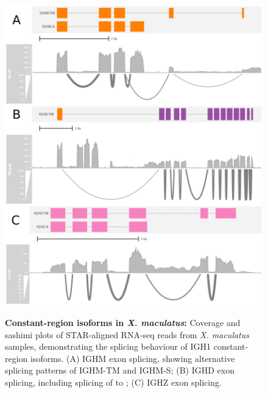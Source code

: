 			\begin{figure}
	\includegraphics[width=\textwidth]{_Figures/png/xma-locus-sashimi}
	\begin{subfigure}{0em}
        \label{fig:xma-locus-sashimi-m}
    \end{subfigure}
    \begin{subfigure}{0em}
        \label{fig:xma-locus-sashimi-d}
    \end{subfigure}
    \begin{subfigure}{0em}
        \label{fig:xma-locus-sashimi-z}
    \end{subfigure}
	\caption[Constant-region isoforms in \textit{X. maculatus}]{\textbf{Constant-region isoforms in \textit{X. maculatus}:} Coverage and sashimi plots of STAR-aligned RNA-seq reads from \textit{X. maculatus} samples, demonstrating the splicing behaviour of IGH1 constant-region isoforms. (A) IGHM exon splicing, showing alternative splicing patterns of IGHM-TM and IGHM-S; (B) IGHD exon splicing, including splicing of  to ; (C) IGHZ exon splicing.}
	\label{fig:xma-locus-sashimi}
	\end{figure}


